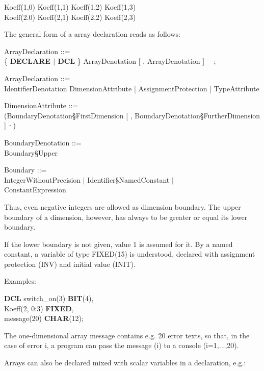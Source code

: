 Koeff(1,0) \x  Koeff(1,1) \x  Koeff(1,2) \x  Koeff(1,3) \\
Koeff(2.0) \x  Koeff(2,1) \x  Koeff(2,2) \x  Koeff(2,3)

The general form of a array declaration reads as follows:

\begin{front}
ArrayDeclaration ::=\\
\x \{ {\bf DECLARE $\mid$ DCL} \} ArrayDenotation [ , ArrayDenotation ] $^{...}$ ;

ArrayDeclaration ::=\\
\x IdentifierDenotation DimensionAttribute [ AssignmentProtection ] TypeAttribute\\
\x [ GlobalAttribute ] [ InitialisationAttribute ]

DimensionAttribute ::=\\
\x (BoundaryDenotation\S FirstDimension [ , BoundaryDenotation\S FurtherDimension ] $^{...}$)

BoundaryDenotation ::=\\
 Boundary\S Upper

Boundary ::=\\
\x [ - ] IntegerWithoutPrecision $\mid$ Identifier\S NamedConstant $\mid$ \\
\x ConstantExpression
\end{front}
\begin{grammar}


\end{grammar}

Thus, even negative integers are allowed as dimension boundary. The
upper boundary of a dimension, however, has always to be greater or
equal its lower boundary.

If the lower boundary is not given, value 1 is assumed for it. By a
named constant, a variable of type FIXED(15) is understood, declared
with assignment protection (INV) and initial value (INIT).

Examples:

{\bf DCL} switch\_on(3) {\bf BIT}(4),\\
\x Koeff(2, 0:3) {\bf FIXED},\\
\x message(20) {\bf CHAR}(12);

The one-dimensional array message contains e.g. 20 error texts, so that,
in the case of error i, a program can pass the message (i) to a console
(i=1,...,20).

Arrays can also be declared mixed with scalar variables in a declaration,
e.g.:

